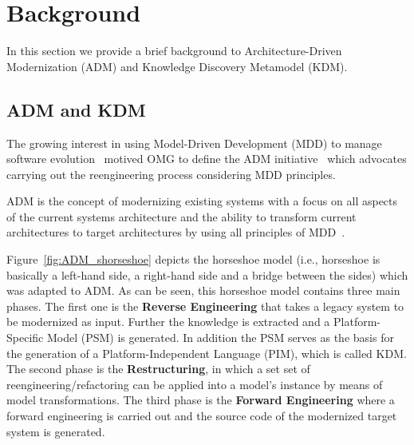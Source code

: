 
\section{Background} %
\label{sec:background}

In this section we provide a brief background to Architecture-Driven Modernization (ADM) and Knowledge Discovery Metamodel (KDM). 


\subsection{ADM and KDM}

The growing interest in using Model-Driven Development (MDD) to manage software evolution~\cite{Heckel2008, Andrade:2005, Reus:2006} 
%
%
motived OMG to define the ADM initiative~\cite{1686216} which advocates carrying out the reengineering process considering MDD principles. 

ADM is the concept of modernizing existing systems with a focus on all aspects of the current systems architecture and the ability to transform current architectures to target architectures by using all principles of MDD~\cite[p.~60]{Ulrich:2010:IST:1841736}. 


Figure~\ref{fig:ADM_shorseshoe} depicts the horseshoe model (i.e., horseshoe is basically a left-hand
side, a right-hand side and a bridge between the sides) which was adapted to ADM. %
As can be seen, this horseshoe model contains three main phases. The first one is the \textbf{Reverse Engineering} that takes a legacy system to be modernized as input.  Further the knowledge is extracted and a Platform-Specific Model (PSM) is generated. In addition the PSM serves as the basis for the generation of a Platform-Independent Language (PIM), which is called KDM. The second phase is the \textbf{Restructuring}, in which a set set of reengineering/refactoring can be applied into a model's instance by means of model transformations. The third phase is the \textbf{Forward Engineering} where a forward engineering is carried out and the source code of the modernized target system is generated.

